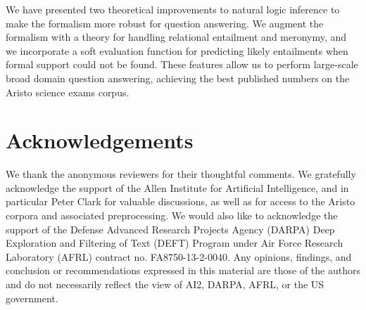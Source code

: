 We have presented two theoretical improvements to natural logic inference to
  make the formalism more robust for question answering.
We augment the formalism with a theory for handling relational entailment and meronymy,
  and we incorporate a soft evaluation function for predicting likely entailments when
  formal support could not be found.
These features allow us to perform large-scale broad domain question answering,
  achieving the best published numbers on the Aristo science exams corpus.


\section*{Acknowledgements}
We thank the anonymous reviewers for their
  thoughtful comments. 
We gratefully acknowledge the support of the Allen Institute
  for Artificial Intelligence, and in particular Peter Clark for
  valuable discussions, as well as for access to the Aristo corpora
  and associated preprocessing.
We would also like to acknowledge the support of the 
  Defense Advanced Research Projects Agency (DARPA) Deep Exploration
  and Filtering of Text (DEFT) Program under
  Air Force Research Laboratory (AFRL) contract
  no. FA8750-13-2-0040. 
Any opinions, findings, and conclusion or recommendations expressed
  in this material are those of the authors and
  do not necessarily reflect the view of AI2, DARPA,
  AFRL, or the US government.

